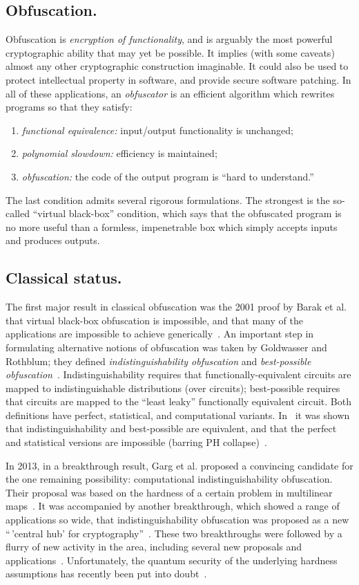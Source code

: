 \documentclass[11pt]{amsart}
\numberwithin{equation}{section}
\begin{document}
\subsection{Obfuscation.} Obfuscation is \emph{encryption of functionality}, and is arguably the most powerful cryptographic ability that may yet be possible. It implies (with some caveats) almost any other cryptographic construction imaginable. It could also be used to protect intellectual property in software, and provide secure software patching. In all of these applications, an \emph{obfuscator} is an efficient algorithm which rewrites programs so that they satisfy:
\begin{enumerate}\label{def:obf-informal}
\item \emph{functional equivalence:} input/output functionality is unchanged;
\item \emph{polynomial slowdown:} efficiency is maintained;
\item \emph{obfuscation:} the code of the output program is ``hard to understand.''
\end{enumerate}
The last condition admits several rigorous formulations. The strongest is the so-called ``virtual black-box'' condition, which says that the obfuscated program is no more useful than a formless, impenetrable box which simply accepts inputs and produces outputs. 

\subsection{Classical status.} The first major result in classical obfuscation was the 2001 proof by Barak et al. that virtual black-box obfuscation is impossible, and that many of the applications are impossible to achieve generically~\cite{BGIRSVY01, BGIRSVY12}. An important step in formulating alternative notions of obfuscation was taken by Goldwasser and Rothblum; they defined \emph{indistinguishability obfuscation} and \emph{best-possible obfuscation}~\cite{GR07}. Indistinguishability requires that functionally-equivalent circuits are mapped to indistinguishable distributions (over circuits); best-possible requires that circuits are mapped to the ``least leaky'' functionally equivalent circuit. Both definitions have perfect, statistical, and computational variants. In~\cite{GR07} it was shown that indistinguishability and best-possible are equivalent, and that the perfect and statistical versions are impossible (barring PH collapse)~\cite{GR07}. 

In 2013, in a breakthrough result, Garg et al. proposed a convincing candidate for the one remaining possibility: computational indistinguishability obfuscation. Their proposal was based on the hardness of a certain problem in multilinear maps~\cite{GGHRSW13}. It was accompanied by another breakthrough, which showed a range of applications so wide, that indistinguishability obfuscation was proposed as a new ``\,'central hub' for cryptography''~\cite{SW14}. These two breakthroughs were followed by a flurry of new activity in the area, including several new proposals and applications~\cite{BGKPS14, BCCGKPR14, BZ14, BR14, GGHW14, HSW14}. Unfortunately, the quantum security of the underlying hardness assumptions has recently been put into doubt~\cite{Pei15}.
\end{document}
